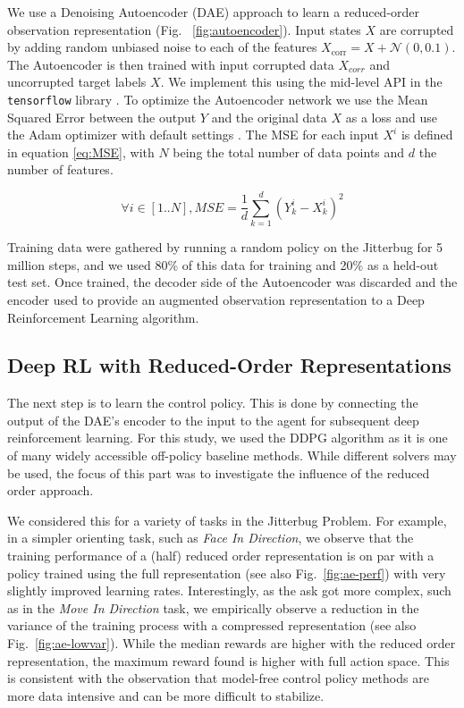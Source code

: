 \documentclass[letterpaper, 10 pt, conference]{ieeeconf}
\begin{document}
We use a Denoising Autoencoder (DAE) approach to learn a reduced-order observation representation (Fig. ~\ref{fig:autoencoder}).
Input states $X$ are corrupted by adding random unbiased noise to each of the features $X_\text{corr} = X + \mathcal{N}(0, 0.1)$.
The Autoencoder is then trained with input corrupted data $X_{corr}$ and uncorrupted target labels $X$.
We implement this using the mid-level API in the \texttt{tensorflow} library \cite{Abadi2015Tensorflow}.
To optimize the Autoencoder network we use the Mean Squared Error between the output $Y$ and the original data $X$ as a loss and use the Adam optimizer with default settings \cite{Adam}. The MSE for each input $X^i$ is defined in equation \ref{eq:MSE}, with $N$ being the total number of data points and $d$ the number of features.

\begin{equation}
\forall i \in [1..N], MSE = \frac{1}{d} \sum_{k=1}^d(Y_{k}^i - X_{k}^i)^2
\label{eq:MSE}
\end{equation}

Training data were gathered by running a random policy on the Jitterbug for 5 million steps, and we used 80\% of this data for training and 20\% as a held-out test set.
Once trained, the decoder side of the Autoencoder was discarded and the encoder used to provide an augmented observation representation to a Deep Reinforcement Learning algorithm.

\subsection{Deep RL with Reduced-Order Representations}

The next step is to learn the control policy.   This is done by connecting the output of the DAE's encoder to the input to the agent for subsequent deep reinforcement learning.     For this study, we used the DDPG algorithm as it is one of many  widely accessible off-policy baseline methods.  While different solvers may be used, the focus of this part was to investigate the influence of the reduced order approach.  

We considered this for a variety of tasks in the Jitterbug Problem.  For example, in a simpler orienting task, such as \emph{Face In Direction}, we observe that the training performance of a (half) reduced order representation is on par with a policy trained using the full representation (see also Fig.~\ref{fig:ae-perf}) with very slightly improved learning rates.  Interestingly, as the ask got more complex, such as in the \emph{Move In Direction} task, we empirically observe a reduction in the variance of the training process with a compressed representation (see also Fig.~\ref{fig:ae-lowvar}).  While the median rewards are higher with the reduced order representation, the maximum reward found is higher with full action space.  This is consistent with the observation that model-free control policy methods are more data intensive and can be more difficult to stabilize.  
\end{document}
